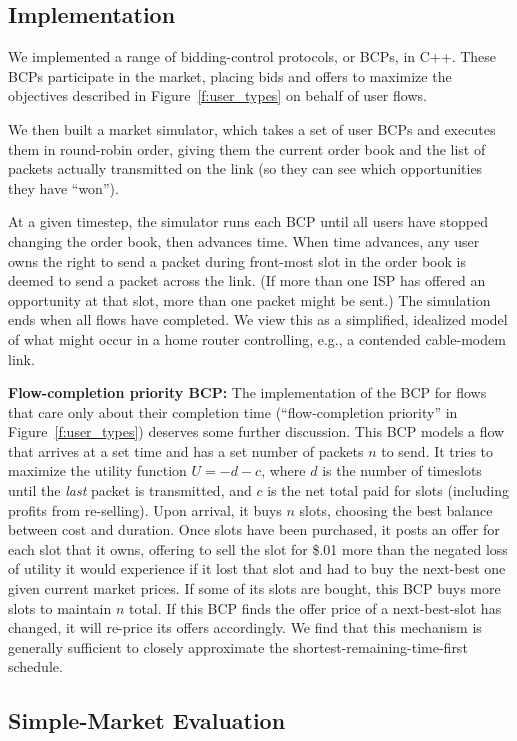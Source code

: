 \subsection{Implementation}
We implemented a range of bidding-control protocols, or BCPs, in
C++. These BCPs participate in the market, placing bids and offers to
maximize the objectives described in Figure~\ref{f:user_types} on
behalf of user flows.

We then built a market simulator, which takes a set of user BCPs
and executes them in round-robin order, giving them the current order
book and the list of packets actually transmitted on the link (so they
can see which opportunities they have ``won'').

At a given timestep, the simulator runs each BCP until all users have
stopped changing the order book, then advances time. When time
advances, any user owns the right to send a packet during front-most
slot in the order book is deemed to send a packet across the link. (If more than one
ISP has offered an opportunity at that slot, more than one packet
might be sent.) The simulation ends when all flows have
completed. We view this as a simplified, idealized model of what might
occur in a home router controlling, e.g., a contended cable-modem link.

\textbf{Flow-completion priority BCP:} The implementation of the
BCP for flows that care only about their completion time
(``flow-completion priority'' in Figure~\ref{f:user_types}) deserves
some further discussion. This BCP models a flow that arrives at a set
time and has a set number of packets $n$ to send. It tries to maximize
the utility function $U = -d - c$, where $d$ is the number of
timeslots until the \emph{last} packet is transmitted, and $c$ is the
net total paid for slots (including profits from re-selling).  Upon arrival, it buys $n$
slots, choosing the best balance between cost and duration. Once slots have been
purchased, it posts an offer for each slot that it owns, offering
to sell the slot for \$.01
more than the negated loss of utility it would experience if it lost
that slot and had to buy the next-best one given current market prices.
If some of its slots are bought, this BCP buys more slots to maintain $n$ total.
If this BCP finds the offer price of a next-best-slot has changed, it will re-price its offers accordingly.
We find that this mechanism is generally sufficient to closely approximate the shortest-remaining-time-first schedule.

\subsection{Simple-Market Evaluation}
\label{ss:eval}

